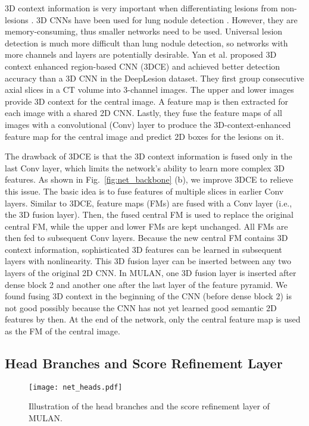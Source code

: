 \documentclass[runningheads]{llncs}
\def\Fig#1{{Fig.\ \ref{fig:#1}}}
\begin{document}
3D context information is very important when differentiating lesions from non-lesions \cite{Yan20183DCE}. 3D CNNs have been used for lung nodule detection \cite{Liao2019leaky}. However, they are memory-consuming, thus smaller networks need to be used. Universal lesion detection is much more difficult than lung nodule detection, so networks with more channels and layers are potentially desirable. Yan et al. \cite{Yan20183DCE} proposed 3D context enhanced region-based CNN (3DCE) and achieved better detection accuracy than a 3D CNN in the DeepLesion dataset. They first group consecutive axial slices in a CT volume into 3-channel images. The upper and lower images provide 3D context for the central image. A feature map is then extracted for each image with a shared 2D CNN. Lastly, they fuse the feature maps of all images with a convolutional (Conv) layer to produce the 3D-context-enhanced feature map for the central image and predict 2D boxes for the lesions on it.

The drawback of 3DCE is that the 3D context information is fused only in the last Conv layer, which limits the network's ability to learn more complex 3D features. As shown in \Fig{net_backbone} (b), we improve 3DCE to relieve this issue. The basic idea is to fuse features of multiple slices in earlier Conv layers. Similar to 3DCE, feature maps (FMs) are fused with a Conv layer (i.e., the 3D fusion layer). Then, the fused central FM is used to replace the original central FM, while the upper and lower FMs are kept unchanged. All FMs are then fed to subsequent Conv layers. Because the new central FM contains 3D context information, sophisticated 3D features can be learned in subsequent layers with nonlinearity. This 3D fusion layer can be inserted between any two layers of the original 2D CNN.  In MULAN, one 3D fusion layer is inserted after dense block 2 and another one after the last layer of the feature pyramid. We found fusing 3D context in the beginning of the CNN (before dense block 2) is not good possibly because the CNN has not yet learned good semantic 2D features by then. At the end of the network, only the central feature map is used as the FM of the central image.

\subsection{Head Branches and Score Refinement Layer}

\begin{figure}[]
	\begin{center}
\texttt{[image: net\_heads.pdf]} \end{center}
\caption{Illustration of the head branches and the score refinement layer of MULAN.}
	\label{fig:net_heads}
\end{figure}
\end{document}
